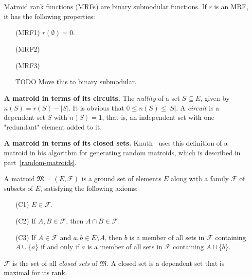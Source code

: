 Matroid rank functions (MRFs) are binary submodular functions. If $r$ is an MRF, it has the following properties:

\begin{enumerate}[align=left]
  \item [(MRF1)] $r(\emptyset) = 0$.
  \item [(MRF2)] \skelline
  \item [(MRF3)] \skelline
  \item [TODO] Move this to binary submodular.
\end{enumerate}



\textbf{A matroid in terms of its circuits.} The \textit{nullity} of a set $S \subseteq E$, given by $n(S) = r(S) - |S|$. It is obvious that $0 \leq n(S) \leq |S|$. A \textit{circuit} is a dependent set $S$ with $n(S) = 1$, that is, an independent set with one "redundant" element added to it. \skelpar



\textbf{A matroid in terms of its closed sets.} Knuth \cite{knuth-1975} \cite{knuth-1975} uses this definition of a matroid in his algorithm for generating random matroids, which is described in part \ref{random-matroids}.

A matroid $\mathfrak{M} = (E, \mathcal{F})$ is a ground set of elements $E$ along with a family $\mathcal{F}$ of subsets of $E$, satisfying the following axioms:
\begin{itemize}
  \item [(C1)] $E \in \mathcal{F}$.
  \item [(C2)] If $A, B \in \mathcal{F}$, then $A \cap B \in \mathcal{F}$.
  \item [(C3)] If $A \in \mathcal{F}$ and $a,b \in E \setminus A$, then $b$ is a member of all sets in $\mathcal{F}$ containing $A \cup \{a\}$ if and only if $a$ is a member of all sets in $\mathcal{F}$ containing $A \cup \{b\}$.
\end{itemize}

$\mathcal{F}$ is the set of all \textit{closed sets} of $\mathfrak{M}$. A closed set is a dependent set that is maximal for its rank.

\skelpar
